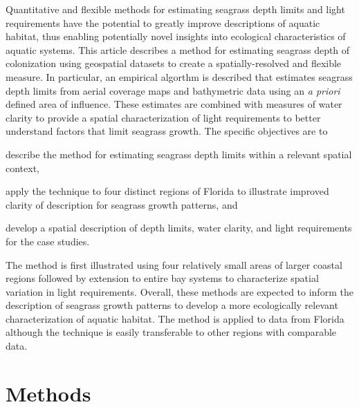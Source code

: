 \documentclass[letterpaper,12pt,oneside]{article}\usepackage[]{graphicx}\usepackage[]{color}
\begin{document}
Quantitative and flexible methods for estimating seagrass depth limits and light requirements have the potential to greatly improve descriptions of aquatic habitat, thus enabling potentially novel insights into ecological characteristics of aquatic systems.  This article describes a method for estimating seagrass depth of colonization using geospatial datasets to create a spatially-resolved and flexible measure.  In particular, an empirical algorthm is described that estimates seagrass depth limits from aerial coverage maps and bathymetric data using an \textit{a priori} defined area of influence. These estimates are combined with measures of water clarity to provide a spatial characterization of light requirements to better understand factors that limit seagrass growth.  The specific objectives are to\begin{inparaenum}[1\upshape)]
\item describe the method for estimating seagrass depth limits within a relevant spatial context, 
\item apply the technique to four distinct regions of Florida to illustrate improved clarity of description for seagrass growth patterns, and
\item develop a spatial description of depth limits, water clarity, and light requirements for the case studies.  
\end{inparaenum}
The method is first illustrated using four relatively small areas of larger coastal regions followed by extension to entire bay systems to characterize spatial variation in light requirements.  Overall, these methods are expected to inform the description of seagrass growth patterns to develop a more ecologically relevant characterization of aquatic habitat.  The method is applied to data from Florida although the technique is easily transferable to other regions with comparable data. 

\section{Methods}
\end{document}
